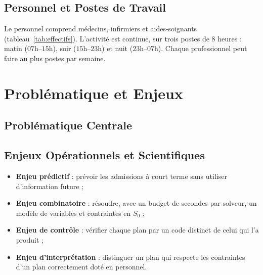 \subsection{Personnel et Postes de Travail}
Le personnel comprend \NbMedecins{} médecins, \NbInfirmiers{} infirmiers et \NbAides{} aides-soignants (tableau~\ref{tab:effectifs}). L'activité est continue, sur trois postes de 8 heures : matin ($07\text{h}$--$15\text{h}$), soir ($15\text{h}$--$23\text{h}$) et nuit ($23\text{h}$--$07\text{h}$). Chaque professionnel peut faire au plus \PostesMax{} postes par semaine.



\section{Problématique et Enjeux}

\subsection{Problématique Centrale}
\begin{center}
\end{center}

\subsection{Enjeux Opérationnels et Scientifiques}
\begin{itemize}
    \item \textbf{Enjeu prédictif} : prévoir les admissions à court terme sans utiliser d'information future ;
    \item \textbf{Enjeu combinatoire} : résoudre, avec un budget de \TempsSolveur{} secondes par solveur, un modèle de \NbVariables{} variables et \NbContraintes{} contraintes en $S_0$ ;
    \item \textbf{Enjeu de contrôle} : vérifier chaque plan par un code distinct de celui qui l'a produit ;
    \item \textbf{Enjeu d'interprétation} : distinguer un plan qui respecte les contraintes d'un plan correctement doté en personnel.
\end{itemize}

